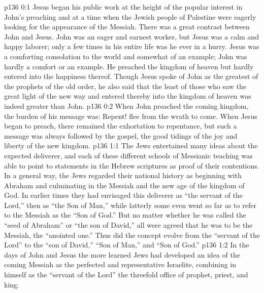 \author{Midwayer Commission}
\vs p136 0:1 Jesus began his public work at the height of the popular interest in John’s preaching and at a time when the Jewish people of Palestine were eagerly looking for the appearance of the Messiah. There was a great contrast between John and Jesus. John was an eager and earnest worker, but Jesus was a calm and happy laborer; only a few times in his entire life was he ever in a hurry. Jesus was a comforting consolation to the world and somewhat of an example; John was hardly a comfort or an example. He preached the kingdom of heaven but hardly entered into the happiness thereof. Though Jesus spoke of John as the greatest of the prophets of the old order, he also said that the least of those who saw the great light of the new way and entered thereby into the kingdom of heaven was indeed greater than John.
\vs p136 0:2 When John preached the coming kingdom, the burden of his message was: Repent! flee from the wrath to come. When Jesus began to preach, there remained the exhortation to repentance, but such a message was always followed by the gospel, the good tidings of the joy and liberty of the new kingdom.
\vs p136 1:1 The Jews entertained many ideas about the expected deliverer, and each of these different schools of Messianic teaching was able to point to statements in the Hebrew scriptures as proof of their contentions. In a general way, the Jews regarded their national history as beginning with Abraham and culminating in the Messiah and the new age of the kingdom of God. In earlier times they had envisaged this deliverer as “the servant of the Lord,” then as “the Son of Man,” while latterly some even went so far as to refer to the Messiah as the “Son of God.” But no matter whether he was called the “seed of Abraham” or “the son of David,” all were agreed that he was to be the Messiah, the “anointed one.” Thus did the concept evolve from the “servant of the Lord” to the “son of David,” “Son of Man,” and “Son of God.”
\vs p136 1:2 In the days of John and Jesus the more learned Jews had developed an idea of the coming Messiah as the perfected and representative Israelite, combining in himself as the “servant of the Lord” the threefold office of prophet, priest, and king.
